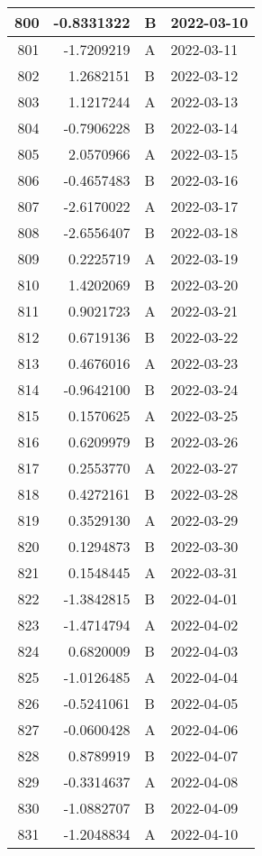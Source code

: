\begin{tabular}{r|r|l|l}
\hline
800 & -0.8331322 & B & 2022-03-10\\
\hline
801 & -1.7209219 & A & 2022-03-11\\
\hline
802 & 1.2682151 & B & 2022-03-12\\
\hline
803 & 1.1217244 & A & 2022-03-13\\
\hline
804 & -0.7906228 & B & 2022-03-14\\
\hline
805 & 2.0570966 & A & 2022-03-15\\
\hline
806 & -0.4657483 & B & 2022-03-16\\
\hline
807 & -2.6170022 & A & 2022-03-17\\
\hline
808 & -2.6556407 & B & 2022-03-18\\
\hline
809 & 0.2225719 & A & 2022-03-19\\
\hline
810 & 1.4202069 & B & 2022-03-20\\
\hline
811 & 0.9021723 & A & 2022-03-21\\
\hline
812 & 0.6719136 & B & 2022-03-22\\
\hline
813 & 0.4676016 & A & 2022-03-23\\
\hline
814 & -0.9642100 & B & 2022-03-24\\
\hline
815 & 0.1570625 & A & 2022-03-25\\
\hline
816 & 0.6209979 & B & 2022-03-26\\
\hline
817 & 0.2553770 & A & 2022-03-27\\
\hline
818 & 0.4272161 & B & 2022-03-28\\
\hline
819 & 0.3529130 & A & 2022-03-29\\
\hline
820 & 0.1294873 & B & 2022-03-30\\
\hline
821 & 0.1548445 & A & 2022-03-31\\
\hline
822 & -1.3842815 & B & 2022-04-01\\
\hline
823 & -1.4714794 & A & 2022-04-02\\
\hline
824 & 0.6820009 & B & 2022-04-03\\
\hline
825 & -1.0126485 & A & 2022-04-04\\
\hline
826 & -0.5241061 & B & 2022-04-05\\
\hline
827 & -0.0600428 & A & 2022-04-06\\
\hline
828 & 0.8789919 & B & 2022-04-07\\
\hline
829 & -0.3314637 & A & 2022-04-08\\
\hline
830 & -1.0882707 & B & 2022-04-09\\
\hline
831 & -1.2048834 & A & 2022-04-10\\

\end{tabular}
